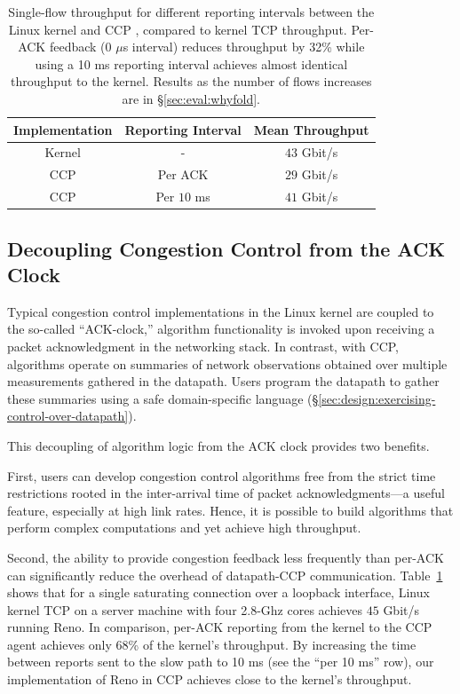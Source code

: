 \begin{table}[]
    \centering
    \begin{tabular}{c|c|c}
        Implementation & Reporting Interval & Mean Throughput \\
        \hline
        Kernel & - & $43$ Gbit/s \\
        CCP & Per ACK & $29$ Gbit/s \\
        CCP & Per $10$ ms & $41$ Gbit/s \\
    \end{tabular}
    \caption{Single-flow throughput for different reporting intervals between
      the Linux kernel and CCP \userspace, compared to kernel TCP
      throughput. Per-ACK feedback (0 $\mu$s interval) reduces throughput by
      32\% while using a 10 ms reporting interval
      achieves almost identical throughput to the kernel. Results as the number
      of flows  increases are in
      \S\ref{sec:eval:whyfold}.}\label{tab:perf:interval}
      \vspace{-10pt}
\end{table}

\subsection{Decoupling Congestion Control from the ACK Clock}
\label{sec:design:decoupling-cc-from-ack-clock}

Typical congestion control implementations in the Linux kernel are coupled to the so-called ``ACK-clock,'' \ie algorithm functionality is invoked upon receiving a packet acknowledgment in the networking stack.
In contrast, with CCP, algorithms operate on summaries of network observations obtained over multiple measurements gathered in the datapath.
Users program the datapath to gather these summaries using a safe domain-specific language (\S\ref{sec:design:exercising-control-over-datapath}).

This decoupling of algorithm logic from the ACK clock provides two benefits.

First, users can develop congestion control algorithms free from the strict
time restrictions rooted in the inter-arrival time of packet acknowledgments---a useful feature, especially at high link rates.
Hence, it is possible to build algorithms that perform complex computations and yet achieve high throughput.

Second, the ability to provide congestion feedback less frequently than per-ACK can significantly reduce the overhead of datapath-CCP communication.
Table~\ref{tab:perf:interval} shows that for a single saturating 
connection over a loopback interface, Linux kernel TCP on a server machine
with four 2.8-Ghz cores achieves $45$ Gbit/s running Reno.
In comparison, per-ACK reporting from the kernel to the CCP agent achieves
only 68\% of the kernel's throughput.
By increasing the time between reports sent to the slow path to 10 ms (see the
``per 10 ms'' row), our implementation of Reno in CCP achieves close to the kernel's throughput.

